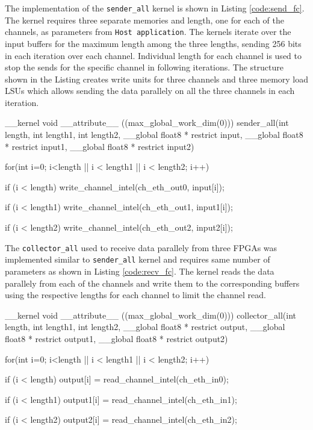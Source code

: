 The implementation of the \texttt{sender\_all} kernel is shown in Listing \ref{code:send_fc}.
The kernel requires three separate memories and length, one for each of the channels, as
parameters from \texttt{Host application}. The kernels iterate over the input buffers for the maximum length
among the three lengths, sending 256 bits in each iteration over each channel. Individual
length for each channel is used to stop the sends for the specific channel in following
iterations. The structure shown in the Listing creates write units for three channels and three
memory load \ac{LSU}s which allows sending the data parallely on all the three channels
in each iteration.

\begin{CppCode} [caption=Sender Kernel for \texttt{fully connected}, frame=tlrb, label=code:send_fc, float]
__kernel void __attribute__ ((max_global_work_dim(0)))
sender_all(int length, int length1, int length2,
            __global float8 * restrict input,
            __global float8 * restrict input1,
            __global float8 * restrict input2)
{
    for(int i=0; i<length || i < length1 || i < length2; i++)
    {
        if (i < length)
            write_channel_intel(ch_eth_out0, input[i]);

        if (i < length1)
            write_channel_intel(ch_eth_out1, input1[i]);

        if (i < length2)
            write_channel_intel(ch_eth_out2, input2[i]);
    }
}
\end{CppCode}

The \texttt{collector\_all} used to receive data parallely from three FPGAs
was implemented similar to \texttt{sender\_all} kernel and requires same
number of parameters as shown in Listing \ref{code:recv_fc}. The kernel
reads the data parallely from each of the channels and write them to the
corresponding buffers using the respective lengths for each channel
to limit the channel read.

\begin{CppCode} [caption=Collector Kernel for \texttt{fully connected}, frame=tlrb, label=code:recv_fc, float]
__kernel void __attribute__ ((max_global_work_dim(0)))
collector_all(int length, int length1, int length2,
            __global float8 * restrict output,
            __global float8 * restrict output1,
            __global float8 * restrict output2)
{
    for(int i=0; i<length || i < length1 || i < length2; i++)
    {
        if (i < length)
            output[i] = read_channel_intel(ch_eth_in0);

        if (i < length1)
            output1[i] = read_channel_intel(ch_eth_in1);

        if (i < length2)
            output2[i] = read_channel_intel(ch_eth_in2);
    }
}
\end{CppCode}


